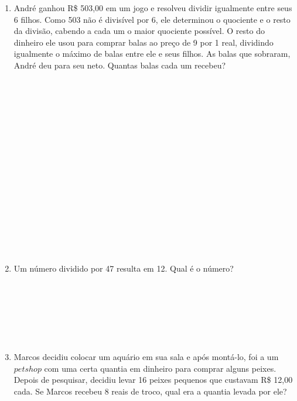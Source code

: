 \documentclass[a4paper,14pt]{article}
\begin{document}
\begin{multicols}{2}
\begin{enumerate}
            \item André ganhou R\$ 503,00 em um jogo e resolveu dividir igualmente entre seus 6 filhos. Como 503 não é divisível por 6, ele determinou o quociente e o resto da divisão, cabendo a cada um o maior quociente possível. O resto do dinheiro ele usou para comprar balas ao preço de 9 por 1 real, dividindo igualmente o máximo de balas entre ele e seus filhos. As balas que sobraram, André deu para seu neto. Quantas balas cada um recebeu? \\\\\\\\\\\\\\\\\\\\\\\\\\\\\\\\\\
            \item Um número dividido por 47 resulta em 12. Qual é o número? \\\\\\\\\\\\\\
            \item Marcos decidiu colocar um aquário em sua sala e após montá-lo, foi a um $pet shop$ com uma certa quantia em dinheiro para comprar alguns peixes. Depois de pesquisar, decidiu levar 16 peixes pequenos que custavam R\$ 12,00 cada. Se Marcos recebeu 8 reais de troco, qual era a quantia levada por ele?
        \end{enumerate}
    $~$ \\ $~$ \\ $~$ \\ $~$ \\ $~$ \\ $~$ \\ $~$ \\ $~$ \\ $~$ \\ $~$ \\ $~$ \\ $~$ \\ $~$ \\ $~$ \\ $~$ \\ $~$ \\ $~$ \\ $~$ \\ $~$ \\ $~$ \\ $~$ 
    \end{multicols}
\end{document}
